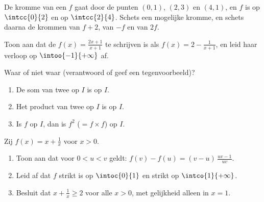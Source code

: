\begin{exercise}[$\star\star$]\label{exo:g11:func:8}
De kromme van een  $f$ gaat door de punten $(0, 1)$, $(2, 3)$ en
$(4, 1)$, en $f$ is  op $\intcc{0}{2}$ en  op $\intcc{2}{4}$.
Schets een mogelijke kromme, en schets daarna de krommen van $f + 2$, van
$-f$ en van $2f$.
\end{exercise}

\begin{exercise}[$\star\star$]\label{exo:g11:func:9}
Toon aan dat de  $f(x) = \frac{2x+1}{x+1}$ te schrijven is als
$f(x) = 2 - \frac{1}{x+1}$, en leid haar verloop op $\intoo{-1}{+\infty}$
af.
\end{exercise}

\begin{exercise}[$\star\star$]\label{exo:g11:func:10}
Waar of niet waar (verantwoord of geef een tegenvoorbeeld)?
\begin{enumerate}
  \item De som van twee  op $I$ is  op $I$.
  \item Het product van twee  op $I$ is  op $I$.
  \item Is $f$  op $I$, dan is $f^2$ ($= f \times f$)  op
        $I$.
\end{enumerate}
\end{exercise}

\begin{exercise}[$\star\star\star$]\label{exo:g11:func:11}
Zij $f(x) = x + \frac{1}{x}$ voor $x > 0$.
\begin{enumerate}
  \item Toon aan dat voor $0 < u < v$ geldt:
        $f(v) - f(u) = (v - u)\,\frac{uv - 1}{uv}$.
  \item Leid af dat $f$ strikt  is op $\intoc{0}{1}$ en strikt
         op $\intco{1}{+\infty}$.
  \item Besluit dat $x + \frac1x \geq 2$ voor alle $x > 0$, met gelijkheid
        alleen in $x = 1$.
\end{enumerate}
\end{exercise}

